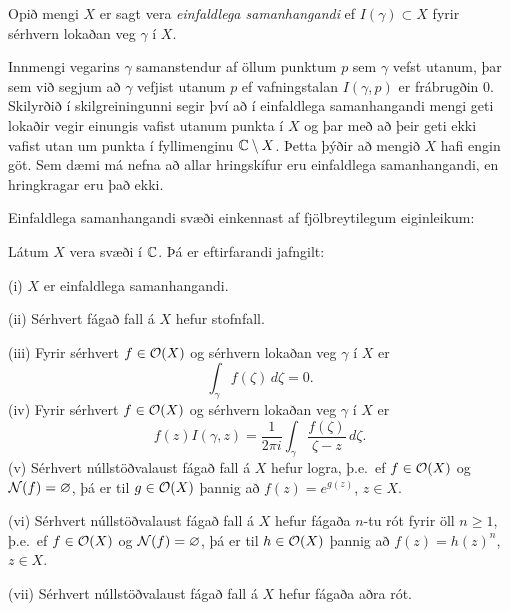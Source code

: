 \begin{sk}  Opið mengi $X$ er sagt vera {\it einfaldlega
samanhangandi} ef
$I(\gamma)\subset X$ fyrir sérhvern lokaðan veg $\gamma$ í $X$.
\end{sk}

Innmengi vegarins $\gamma$ samanstendur af öllum punktum $p$ sem
$\gamma$ vefst utanum, þar sem við segjum að $\gamma$ vefjist utanum 
$p$ ef vafningstalan $I(\gamma,p)$ er frábrugðin $0$.
Skilyrðið í skilgreiningunni segir því að í einfaldlega samanhangandi
mengi geti lokaðir vegir einungis vafist utanum punkta í $X$ og þar
með að þeir geti ekki vafist utan um punkta í fyllimenginu
${\mathbb C}\setminus X$.  Þetta þýðir að mengið $X$ hafi engin göt.  Sem dæmi
má nefna að allar hringskífur eru einfaldlega samanhangandi, en
hringkragar eru það ekki.    


\noindent
Einfaldlega samanhangandi svæði einkennast af fjölbreytilegum eiginleikum:


\begin{se}  Látum $X$ vera svæði í ${\mathbb C}$.  Þá er eftirfarandi jafngilt:

\smallskip\noindent
(i)  $X$ er einfaldlega samanhangandi.

\smallskip\noindent
(ii) Sérhvert fágað fall á $X$ hefur stofnfall.

\smallskip\noindent
(iii) Fyrir sérhvert $f\in {\cal O}(X)$ og sérhvern lokaðan veg $\gamma$ í
$X$ er
 \begin{equation*}\int_\gamma f(\zeta) \, d\zeta = 0.
\label{10.11.1}
 \end{equation*}
\smallskip\noindent
(iv) Fyrir sérhvert $f\in {\cal O}(X)$ og sérhvern lokaðan veg $\gamma$ í
$X$ er
 \begin{equation*}f(z)I(\gamma,z) = \dfrac 1{2\pi i}\int_\gamma \dfrac{f(\zeta)}
{\zeta-z} \, d\zeta.
\label{10.11.2}
 \end{equation*}
\smallskip\noindent
(v)  Sérhvert núllstöðvalaust fágað fall á $X$ hefur logra, þ.e.~ef
$f\in {\cal O}(X)$ og ${\cal N}(f)=\varnothing$, þá er til $g\in {\cal O}(X)$ þannig að
$f(z)=e^{g(z)}$, $z\in X$.

\smallskip\noindent
(vi) Sérhvert núllstöðvalaust fágað fall á $X$ hefur fágaða $n$-tu rót
fyrir öll $n\geq 1$, þ.e.~ef
$f\in {\cal O}(X)$ og ${\cal N}(f)=\varnothing$, þá er til $h\in {\cal O}(X)$ þannig að
$f(z)=h(z)^n$, $z\in X$.

\smallskip\noindent
(vii) Sérhvert núllstöðvalaust fágað fall á $X$ hefur fágaða aðra rót.
\end{se}
 

